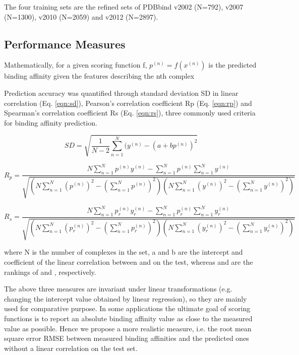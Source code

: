 \documentclass[journal=jacsat,manuscript=article]{achemso}
\begin{document}
The four training sets are the refined sets of PDBbind v2002 (N=792), v2007 (N=1300), v2010 (N=2059) and v2012 (N=2897).

\subsection{Performance Measures}

Mathematically, for a given scoring function f, $p^{(n)}=f(x^{(n)})$ is the predicted binding affinity given the features   describing the nth complex 

Prediction accuracy was quantified through standard deviation SD in linear correlation (Eq. \ref{eqn:sd}), Pearson's correlation coefficient Rp (Eq. \ref{eqn:rp}) and Spearman's correlation coefficient Rs (Eq. \ref{eqn:rs}), three commonly used criteria for binding affinity prediction.

\begin{equation}
SD = \sqrt{\frac{1}{N-2}\sum_{n=1}^N(y^{(n)}-(a+bp^{(n)})^2}
\label{eqn:sd}
\end{equation}

\begin{equation}
R_p = \frac{N\sum_{n=1}^Np^{(n)}y^{(n)}-\sum_{n=1}^Np^{(n)}\sum_{n=1}^Ny^{(n)}}{\sqrt{(N\sum_{n=1}^N(p^{(n)})^2-(\sum_{n=1}^Np^{(n)})^2)(N\sum_{n=1}^N(y^{(n)})^2-(\sum_{n=1}^Ny^{(n)})^2)}}
\label{eqn:rp}
\end{equation}

\begin{equation}
R_s = \frac{N\sum_{n=1}^Np_r^{(n)}y_r^{(n)}-\sum_{n=1}^Np_r^{(n)}\sum_{n=1}^Ny_r^{(n)}}{\sqrt{(N\sum_{n=1}^N(p_r^{(n)})^2-(\sum_{n=1}^Np_r^{(n)})^2)(N\sum_{n=1}^N(y_r^{(n)})^2-(\sum_{n=1}^Ny_r^{(n)})^2)}}
\label{eqn:rs}
\end{equation}

where N is the number of complexes in the set, a and b are the intercept and coefficient of the linear correlation between   and   on the test, whereas   and   are the rankings of   and  , respectively. 

The above three measures are invariant under linear transformations (e.g. changing the intercept value obtained by linear regression), so they are mainly used for comparative purpose. In some applications the ultimate goal of scoring functions is to report an absolute binding affinity value as close to the measured value as possible. Hence we propose a more realistic measure, i.e. the root mean square error RMSE between measured binding affinities and the predicted ones without a linear correlation on the test set.
\end{document}
